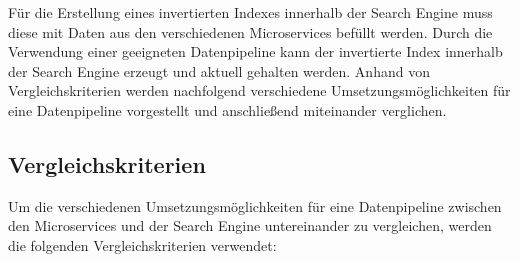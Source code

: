 Für die Erstellung eines invertierten Indexes innerhalb der Search Engine muss diese mit Daten aus den verschiedenen Microservices befüllt werden. Durch die Verwendung einer geeigneten Datenpipeline kann der invertierte Index innerhalb der Search Engine erzeugt und aktuell gehalten werden. Anhand von Vergleichskriterien werden nachfolgend verschiedene Umsetzungsmöglichkeiten für eine Datenpipeline vorgestellt und anschließend miteinander verglichen.

\subsection{Vergleichskriterien\label{subsec4.1.1:Unterunterpunkt-1}}

Um die verschiedenen Umsetzungsmöglichkeiten für eine Datenpipeline zwischen den Microservices und der Search Engine untereinander zu vergleichen, werden die folgenden Vergleichskriterien verwendet:


